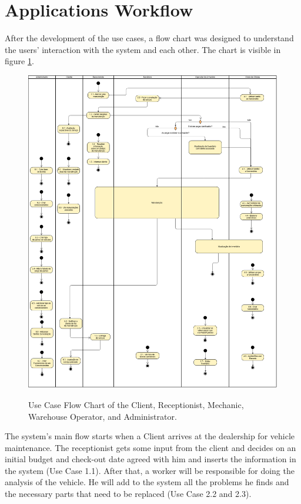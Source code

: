 \section{Applications Workflow}

After the development of the use cases, a flow chart was designed to understand the users' interaction with the system and each other. The chart is visible in figure \ref{fig:figure2}.

\begin{figure}[h]
  \caption{Use Case Flow Chart of the Client, Receptionist, Mechanic, Warehouse Operator, and Administrator.}
  \centering
  \includegraphics[width=\textwidth]{figs/UseCaseDiagram2}
  \label{fig:figure2}
\end{figure}

The system's main flow starts when a Client arrives at the dealership for vehicle maintenance. 
The receptionist gets some input from the client and decides on an initial budget and check-out date agreed with him and inserts the information in the system (Use Case 1.1).
After that, a worker will be responsible for doing the analysis of the vehicle. 
He will add to the system all the problems he finds and the necessary parts that need to be replaced (Use Case 2.2 and 2.3).


